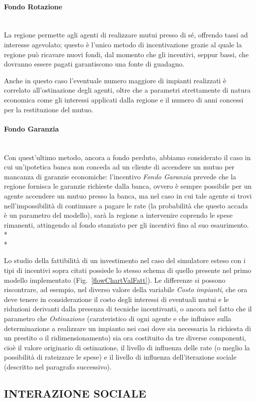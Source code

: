 \documentclass[12pt,a4paper,openright,twoside]{report}
\newcommand{\myparagraph}[1]{\paragraph{#1}\mbox{}\\}
\begin{document}
\myparagraph{Fondo Rotazione}

La regione permette agli agenti di realizzare mutui presso di sé, offrendo tassi ad interesse agevolato; questo è l'unico metodo di incentivazione grazie al quale la regione può ricavare nuovi fondi, dal momento che gli incentivi, seppur bassi, che dovranno essere pagati garantiscono una fonte di guadagno.

Anche in questo caso l'eventuale numero maggiore di impianti realizzati è correlato all'ostinazione degli agenti, oltre che a parametri strettamente di natura economica come gli interessi applicati dalla regione e il numero di anni concessi per la restituzione del mutuo.

\myparagraph{Fondo Garanzia}

Con quest'ultimo metodo, ancora a fondo perduto, abbiamo considerato il caso in cui un'ipotetica banca non conceda ad un cliente di accendere un mutuo per mancanza di garanzie economiche: l'incentivo \emph{Fondo Garanzia} prevede che la regione fornisca le garanzie richieste dalla banca, ovvero è sempre possibile per un agente accendere un mutuo presso la banca, ma nel caso in cui tale agente si trovi nell'impossibilità di continuare a pagare le rate (la probabilità che questo accada è un parametro del modello), sarà la regione a intervenire coprendo le spese rimanenti, attingendo al fondo stanziato per gli incentivi fino al suo esaurimento.\\*\\*

Lo studio della fattibilità di un investimento nel caso del simulatore esteso con i tipi di incentivi sopra citati possiede lo stesso schema di quello presente nel primo modello implementato (Fig.~\ref{flowChartValFatt}). Le differenze si possono riscontrare, ad esempio, nel diverso valore della variabile \emph{Costo impianti}, che ora deve tenere in considerazione il costo degli interessi di eventuali mutui e le riduzioni derivanti dalla presenza di tecniche incentivanti, o ancora nel fatto che il parametro che \emph{Ostinazione} (carateristico di ogni agente e che influisce sulla determinazione a realizzare un impianto nei casi dove sia necessaria la richiesta di un prestito o il ridimensionamento) sia ora costituito da tre diverse componenti, cioè il valore originario di ostinazione, il livello di influenza delle rate (o meglio la possibilità di rateizzare le spese) e il livello di influenza dell'iterazione sociale (descritto nel paragrafo successivo).

\subsection{INTERAZIONE SOCIALE}
\end{document}
